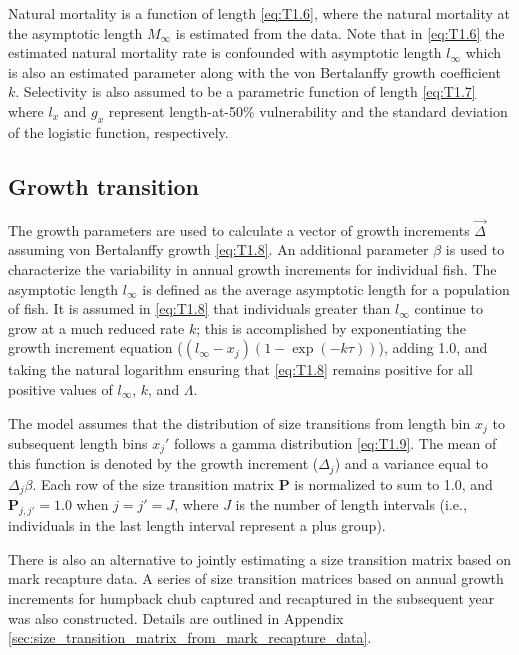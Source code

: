 Natural mortality is a function of length \eqref{eq:T1.6}, where the natural mortality at the asymptotic length $M_\infty$ is estimated from the data.   Note that in \eqref{eq:T1.6} the estimated natural mortality rate is confounded with asymptotic length $l_\infty$ which is also an estimated parameter along with the von Bertalanffy growth coefficient $k$. Selectivity is also assumed to be a parametric function of length \eqref{eq:T1.7} where $l_x$ and $g_x$ represent length-at-50\% vulnerability and the standard deviation of the logistic function, respectively.  

\subsection{Growth transition} %
\label{sub:growth_transition}
The growth parameters are used to calculate a vector of growth increments $\vec{\Delta}$ assuming von Bertalanffy growth \eqref{eq:T1.8}. An additional parameter $\beta$ is used to characterize the variability in annual growth increments for individual fish.  The asymptotic length $l_\infty$ is defined as the average asymptotic length for a population of fish.  It is assumed in \eqref{eq:T1.8} that individuals greater than $l_\infty$ continue to grow at a much reduced rate $k$; this is accomplished by exponentiating the growth increment equation ($(l_\infty-x_j)(1-\exp(-k\tau))$), adding 1.0, and taking the natural logarithm ensuring that \eqref{eq:T1.8} remains positive for all positive values of $l_\infty$, $k$, and $\Lambda$.

The model assumes that the distribution of size transitions from length bin $x_j$ to subsequent length bins $x_j'$ follows a gamma distribution \eqref{eq:T1.9}. The mean of this function is denoted by the growth increment ($\Delta_j$) and a variance equal to $\Delta_j \beta$.  Each row of the size transition matrix $\mathbf{P}$ is normalized to sum to 1.0, and $\mathbf{P}_{j,j'}=1.0$ when $j=j'=J$, where $J$ is the number of length intervals (i.e., individuals in the last length interval represent a plus group).

There is also an alternative to jointly estimating a size transition matrix based on mark recapture data.  A series of size transition matrices based on annual growth increments for humpback chub captured and recaptured in the subsequent year was also constructed. Details are outlined in Appendix \ref{sec:size_transition_matrix_from_mark_recapture_data}.

